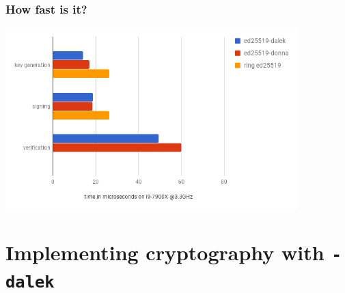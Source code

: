 \documentclass[xetex,aspectratio=169]{beamer}
\begin{document}
  \begin{frame}
    \frametitle{How fast is it?}

    \begin{center}
      \includegraphics[height=7cm]{chart.png}
    \end{center}

  \end{frame}

  
\section{Implementing cryptography with \texttt{-dalek}}
\end{document}
